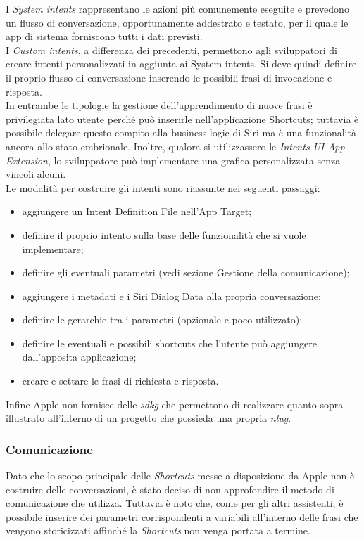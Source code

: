 		I \emph{System intents} rappresentano le azioni più comunemente eseguite e prevedono un flusso di conversazione, opportunamente addestrato e testato, per il quale le app di sistema forniscono tutti i dati previsti. \\
		I \emph{Custom intents}, a differenza dei precedenti, permettono agli sviluppatori di creare intenti personalizzati in aggiunta ai System intents. Si deve quindi definire il proprio flusso di conversazione inserendo le possibili frasi di invocazione e risposta. \\
		In entrambe le tipologie la gestione dell’apprendimento di nuove frasi è privilegiata lato utente perché può inserirle nell'applicazione Shortcuts; tuttavia è possibile delegare questo compito alla business logic di Siri ma è una funzionalità ancora allo stato embrionale. Inoltre, qualora si utilizzassero le \emph{Intents UI App Extension}, lo sviluppatore può implementare una grafica personalizzata senza vincoli alcuni. \\
		Le modalità per costruire gli intenti sono riassunte nei seguenti passaggi:
		\begin{itemize}
			\item aggiungere un Intent Definition File nell’App Target;
			\item definire il proprio intento sulla base delle funzionalità che si vuole implementare;
			\item definire gli eventuali parametri (vedi sezione Gestione della comunicazione);
			\item aggiungere i metadati e i Siri Dialog Data alla propria conversazione;
			\item definire le gerarchie tra i parametri (opzionale e poco utilizzato);
			\item definire le eventuali e possibili shortcuts che l’utente può aggiungere dall'apposita applicazione;
			\item creare e settare le frasi di richiesta e risposta.
		\end{itemize}
		Infine Apple non fornisce delle \emph{\gls{sdkg}} che permettono di realizzare quanto sopra illustrato all'interno di un progetto che possieda una propria \emph{\gls{nlug}}.
		\subsubsection{Comunicazione}
		Dato che lo scopo principale delle \emph{Shortcuts} messe a disposizione da Apple non è costruire delle conversazioni, è stato deciso di non approfondire il metodo di comunicazione che utilizza. Tuttavia è noto che, come per gli altri assistenti, è possibile inserire dei parametri corrispondenti a variabili all'interno delle frasi che vengono storicizzati affinché la \emph{Shortcuts} non venga portata a termine.
